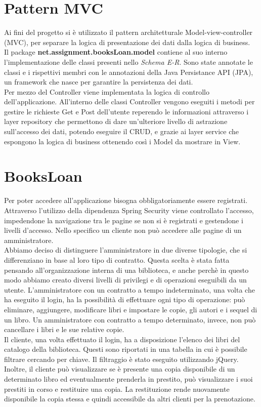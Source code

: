 \documentclass[a4paper,10pt]{article}
\begin{document}
\section*{Pattern MVC}
Ai fini del progetto si è utilizzato il pattern architetturale Model-view-controller (MVC), per separare la logica di presentazione dei dati dalla logica di business.\\

\sloppy\noindent Il package \textbf{net.assignment.booksLoan.model} contiene al suo interno l'implementazione delle classi presenti nello \textit{Schema E-R}. Sono state annotate le classi e i rispettivi membri con le annotazioni della Java Persistance API (JPA), un framework che nasce per garantire la persistenza dei dati.\\

\noindent Per mezzo del Controller viene implementata la logica di controllo dell'applicazione. All'interno delle classi Controller vengono eseguiti i metodi per gestire le richieste Get e Post dell'utente reperendo le informazioni attraverso i layer repository che permettono di dare un'ulteriore livello di astrazione sull'accesso dei dati, potendo eseguire il CRUD, e grazie ai layer service che espongono la logica di business ottenendo così i Model da mostrare in View.

\section*{BooksLoan}
Per poter accedere all’applicazione bisogna obbligatoriamente essere registrati. Attraverso l'utilizzo della dipendenza Spring Security viene controllato l'accesso, impedendone la navigazione tra le pagine se non si è registrati e gestendone i livelli d'accesso. Nello specifico un cliente non può accedere alle pagine di un amministratore.\\

\noindent Abbiamo deciso di distinguere l'amministratore in due diverse tipologie, che si differenziano in base al loro tipo di contratto. Questa scelta è stata fatta pensando all'organizzazione interna di una biblioteca, e anche perchè in questo modo abbiamo creato diversi livelli di privilegi e di operazioni eseguibili da un utente. 
L'amministratore con un contratto a tempo indeterminato, una volta che ha eseguito il login, ha la possibilità di effettuare ogni tipo di operazione: può eliminare, aggiungere, modificare libri e impostare le copie, gli autori e i sequel di un libro.
Un amministratore con contratto a tempo determinato, invece, non può cancellare i libri e le sue relative copie.\\

\noindent Il cliente, una volta effettuato il login, ha a disposizione l'elenco dei libri del catalogo della biblioteca. Questi sono riportati in una tabella in cui è possibile filtrare cercando per chiave. Il filtraggio è stato eseguito utilizzando jQuery. Inoltre, il cliente può visualizzare se è presente una copia disponibile di un determinato libro ed eventualmente prenderla in prestito, può visualizzare i suoi prestiti in corso e restituire una copia. La restituzione rende nuovamente disponibile la copia stessa e quindi accessibile da altri clienti per la prenotazione.\\
\end{document}
